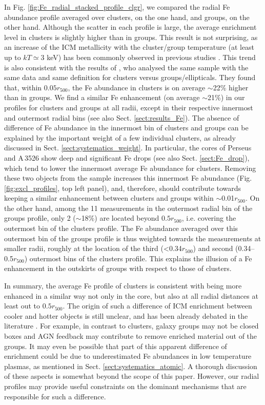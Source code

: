 \documentclass{aa}
\begin{document}
In Fig. \ref{fig:Fe_radial_stacked_profile_clgr}, we compared the radial Fe abundance profile averaged 
over clusters, on the one hand, and groups, on the other hand. Although the scatter in each profile is large, the average enrichment level in clusters is slightly higher than in groups. This result is not surprising, as an increase of the ICM metallicity with the cluster/group temperature (at least up to $kT \simeq 3$ keV) has been commonly observed in previous studies \citep[e.g.][]{2009MNRAS.399..239R,2017MNRAS.464.3169Y}. This trend is also consistent with the results of \citet{2016A&A...592A.157M}, who analysed the same sample with the same data and same definition for clusters versus groups/ellipticals. They found that, within $0.05 r_{500}$, the Fe abundance in clusters is on average $\sim$22\% higher than in groups. We find a similar Fe enhancement (on average $\sim$21\%) in our profiles for clusters and groups at all radii, except in their respective innermost and outermost radial bins (see also Sect. \ref{sect:results_Fe}). The absence of difference of Fe abundance in the innermost bin of clusters and groups can be explained by the important weight of a few individual clusters, as already discussed in Sect. \ref{sect:systematics_weight}. In particular, the cores of Perseus and A\,3526 show deep and significant Fe drops (see also Sect. \ref{sect:Fe_drop}), which tend to lower the innermost average Fe abundance for clusters. Removing these two objects from the sample increases this innermost Fe abundance (Fig. \ref{fig:excl_profiles}, top left panel), and, therefore, should contribute towards keeping a similar enhancement between clusters and groups within $\sim$0.01$r_{500}$. On the other hand, among the 11 measurements in the outermost radial bin of the groups profile, only 2 ($\sim$18\%) are located beyond $0.5 r_{500}$, i.e. covering the outermost bin of the clusters profile. The Fe abundance averaged over this outermost bin of the groups profile is thus weighted towards the measurements at smaller radii, roughly at the location of the third (<0.34$r_{500}$) and second (0.34--0.5$r_{500}$) outermost bins of the clusters profile. This explains the illusion of a Fe enhancement in the outskirts of groups with respect to those of clusters.

In summary, the average Fe profile of clusters is consistent with being more enhanced in a similar way not only in the core, but also at all radial distances at least out to $0.5 r_{500}$. The origin of such a difference of ICM enrichment between cooler and hotter objects is still unclear, and has been already debated in the literature \citep[e.g.][]{2009MNRAS.399..239R,2016MNRAS.456.4266L,2017MNRAS.464.3169Y}. For example, in contrast to clusters, galaxy groups may not be closed boxes \citep[e.g.][]{2011MNRAS.412.1965M} and AGN feedback may contribute to remove enriched material out of the groups. It may even be possible that part of this apparent difference of enrichment could be due to underestimated Fe abundances in low temperature plasmas, as mentioned in Sect. \ref{sect:systematics_atomic}. A thorough discussion of these aspects is somewhat beyond the scope of this paper. However, our radial profiles may provide useful constraints on the dominant mechanisms that are responsible for such a difference.
\end{document}
